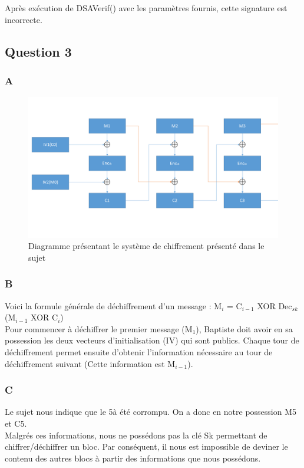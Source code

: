 \documentclass[a4paper, 11pt, oneside]{article}
\begin{document}
Après exécution de DSAVerif() avec les paramètres fournis, cette signature est incorrecte.

\newpage
\subsection{Question 3}

\subsubsection{A}

\begin{figure}[h!]
  \centering
  \includegraphics[width=\textwidth]{CBC.png}
  \caption{Diagramme présentant le système de chiffrement présenté dans le sujet}
\end{figure}

\subsubsection{B}

Voici la formule générale de déchiffrement d'un message : M$_{i}$ = C$_{i-1}$ XOR Dec$_{sk}$(M$_{i-1}$ XOR C$_{i}$)\\[5pt]
Pour commencer à déchiffrer le premier message (M$_{1}$), Baptiste doit avoir en sa possession les deux vecteurs d'initialisation (IV) qui sont publics. Chaque \og tour de déchiffrement \fg  permet ensuite d'obtenir l'information nécessaire au \og tour de déchiffrement \fg  suivant (Cette information est M$_{i-1}$).

\subsubsection{C}

Le sujet nous indique que le 5\ieme à été corrompu. On a donc en notre possession M5 et C5.\\
Malgrés ces informations, nous ne possédons pas la clé Sk permettant de chiffrer/déchiffrer un bloc. Par conséquent, il nous est impossible de deviner le contenu des autres blocs à partir des informations que nous possédons.
\end{document}
